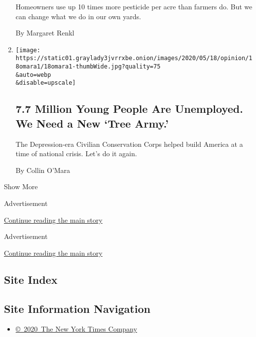 \begin{enumerate}
  Homeowners use up 10 times more pesticide per acre than farmers do.
  But we can change what we do in our own yards.

  By Margaret Renkl
\item
  \href{/2020/05/18/opinion/coronavirus-unemployment-youth.html}{}

  \texttt{[image: https://static01.graylady3jvrrxbe.onion/images/2020/05/18/opinion/18omara1/18omara1-thumbWide.jpg?quality=75\\\&auto=webp\\\&disable=upscale]}

  \hypertarget{77-million-young-people-are-unemployed-we-need-a-new-tree-army}{%
  \subsection{7.7 Million Young People Are Unemployed. We Need a New
  `Tree
  Army.'}\label{77-million-young-people-are-unemployed-we-need-a-new-tree-army}}

  The Depression-era Civilian Conservation Corps helped build America at
  a time of national crisis. Let's do it again.

  By Collin O'Mara
\end{enumerate}

Show More

Advertisement

\protect\hyperlink{after-mid1}{Continue reading the main story}

Advertisement

\protect\hyperlink{after-mktg}{Continue reading the main story}

\hypertarget{site-index}{%
\subsection{Site Index}\label{site-index}}

\hypertarget{site-information-navigation}{%
\subsection{Site Information
Navigation}\label{site-information-navigation}}

\begin{itemize}
\tightlist
\item
  \href{https://help.nytimes3xbfgragh.onion/hc/en-us/articles/115014792127-Copyright-notice}{©~2020~The
  New York Times Company}
\end{itemize}

